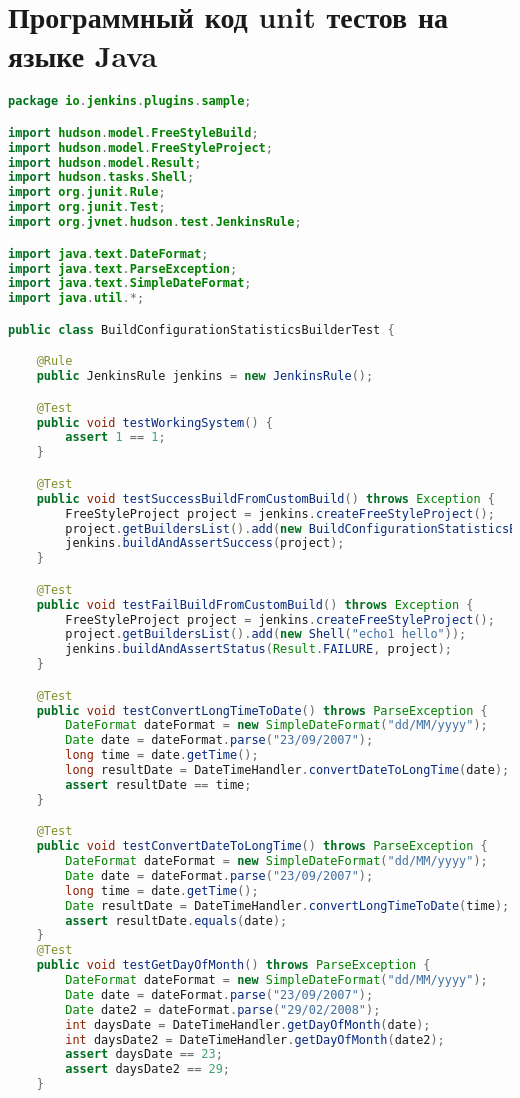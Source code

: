 \chapter{Программный код unit тестов на языке Java}\label{appendix-extra-examples}

\begin{lstlisting}[language=Java]
package io.jenkins.plugins.sample;

import hudson.model.FreeStyleBuild;
import hudson.model.FreeStyleProject;
import hudson.model.Result;
import hudson.tasks.Shell;
import org.junit.Rule;
import org.junit.Test;
import org.jvnet.hudson.test.JenkinsRule;

import java.text.DateFormat;
import java.text.ParseException;
import java.text.SimpleDateFormat;
import java.util.*;

public class BuildConfigurationStatisticsBuilderTest {

    @Rule
    public JenkinsRule jenkins = new JenkinsRule();

    @Test
    public void testWorkingSystem() {
        assert 1 == 1;
    }

    @Test
    public void testSuccessBuildFromCustomBuild() throws Exception {
        FreeStyleProject project = jenkins.createFreeStyleProject();
        project.getBuildersList().add(new BuildConfigurationStatisticsBuilder());
        jenkins.buildAndAssertSuccess(project);
    }

    @Test
    public void testFailBuildFromCustomBuild() throws Exception {
        FreeStyleProject project = jenkins.createFreeStyleProject();
        project.getBuildersList().add(new Shell("echo1 hello"));
        jenkins.buildAndAssertStatus(Result.FAILURE, project);
    }

    @Test
    public void testConvertLongTimeToDate() throws ParseException {
        DateFormat dateFormat = new SimpleDateFormat("dd/MM/yyyy");
        Date date = dateFormat.parse("23/09/2007");
        long time = date.getTime();
        long resultDate = DateTimeHandler.convertDateToLongTime(date);
        assert resultDate == time;
    }

    @Test
    public void testConvertDateToLongTime() throws ParseException {
        DateFormat dateFormat = new SimpleDateFormat("dd/MM/yyyy");
        Date date = dateFormat.parse("23/09/2007");
        long time = date.getTime();
        Date resultDate = DateTimeHandler.convertLongTimeToDate(time);
        assert resultDate.equals(date);
    }
    @Test
    public void testGetDayOfMonth() throws ParseException {
        DateFormat dateFormat = new SimpleDateFormat("dd/MM/yyyy");
        Date date = dateFormat.parse("23/09/2007");
        Date date2 = dateFormat.parse("29/02/2008");
        int daysDate = DateTimeHandler.getDayOfMonth(date);
        int daysDate2 = DateTimeHandler.getDayOfMonth(date2);
        assert daysDate == 23;
        assert daysDate2 == 29;
    }


\end{lstlisting}
